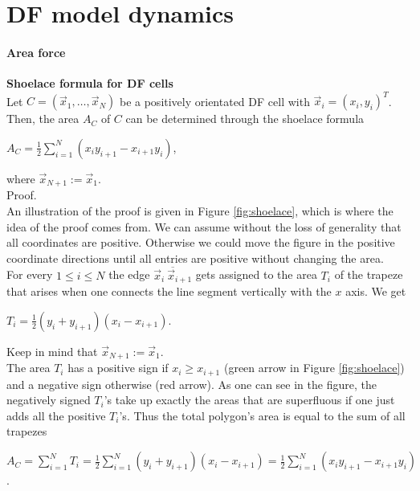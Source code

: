 \section{DF model dynamics} 


\paragraph{Area force}

\begin{proposition}  \textbf{Shoelace formula for DF cells} \label{prop:Shoelace}\\ 
	Let $C = (\vec{x}_1, \ldots, \vec{x}_N)$ be a positively orientated DF cell with $\vec{x}_i = (x_i, y_i)^T$.
	Then, the area $A_C$ of $C$ can be determined through the shoelace formula
	\begin{center}
		$A_C = \frac{1}{2}\sum\limits_{i = 1}^{N} (x_i y_{i+1} - x_{i+1} y_i)$,
	\end{center} 
	where $\vec{x}_{N + 1} := \vec{x}_1$. \\
	Proof. 	\\
	An illustration of the proof is given in Figure \ref{fig:shoelace}, which is where the idea of the proof comes from. We can assume without the loss of generality that all coordinates are positive. Otherwise we could move the figure in the positive coordinate directions until all entries are positive without changing the area. \\
	For every $1 \leq i \leq N$ the edge $\overline{ \vec{x}_i \: \vec{x}_{i+1}}$ gets assigned to the area $T_i$ of the trapeze that arises when one connects the line segment vertically with the $x$ axis. We get
	\begin{center}
		$T_i = \frac{1}{2} (y_i + y_{i+1})(x_i - x_{i+1})$.
	\end{center}
	Keep in mind that $\vec{x}_{N + 1} := \vec{x}_1$. \\
	The area $T_i$ has a positive sign if $x_i \geq x_{i+1}$ (green arrow in Figure \ref{fig:shoelace}) and a negative sign otherwise (red arrow). As one can see in the figure, the negatively signed $T_i$'s take up exactly the areas that are superfluous if one just adds all the positive $T_i$'s. 
	Thus the total polygon's area is equal to the sum of all trapezes
	\begin{center}
		$A_C = \sum\limits_{i = 1}^{N} T_i = \frac{1}{2} \sum\limits_{i = 1}^{N} (y_i + y_{i+1})(x_i - x_{i+1}) = \frac{1}{2}\sum\limits_{i = 1}^{N} (x_i y_{i+1} - x_{i+1} y_i) $.

\end{center}
\end{proposition}
